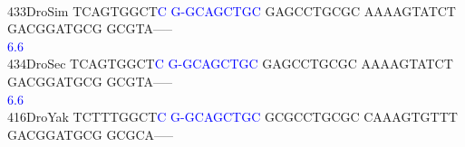 \documentclass[11pt,twoside,reqno,a4paper]{article}
\begin{document}
{\hspace*{4\charwidth}\hspace*{7\charwidth}\hspace*{1\charwidth}\hspace*{1\charwidth}\hspace*{1\charwidth}\hspace*{1\charwidth}\hspace*{1\charwidth}\hspace*{1\charwidth}\\
433\hspace*{1\charwidth}DroSim	TCAGTGGCT\textcolor{blue}{C}	\textcolor{blue}{G}\textcolor{blue}{-}\textcolor{blue}{G}\textcolor{blue}{C}\textcolor{blue}{A}\textcolor{blue}{G}\textcolor{blue}{C}\textcolor{blue}{T}\textcolor{blue}{G}\textcolor{blue}{C}	GAGCCTGCGC	AAAAGTATCT	GACGGATGCG	GCGTA-----	\\
\hspace*{4\charwidth}\hspace*{7\charwidth}\hspace*{9\charwidth}\textcolor{blue}{6.6}\hspace*{1\charwidth}\hspace*{1\charwidth}\hspace*{1\charwidth}\hspace*{1\charwidth}\hspace*{1\charwidth}\hspace*{1\charwidth}\\
434\hspace*{1\charwidth}DroSec	TCAGTGGCT\textcolor{blue}{C}	\textcolor{blue}{G}\textcolor{blue}{-}\textcolor{blue}{G}\textcolor{blue}{C}\textcolor{blue}{A}\textcolor{blue}{G}\textcolor{blue}{C}\textcolor{blue}{T}\textcolor{blue}{G}\textcolor{blue}{C}	GAGCCTGCGC	AAAAGTATCT	GACGGATGCG	GCGTA-----	\\
\hspace*{4\charwidth}\hspace*{7\charwidth}\hspace*{9\charwidth}\textcolor{blue}{6.6}\hspace*{1\charwidth}\hspace*{1\charwidth}\hspace*{1\charwidth}\hspace*{1\charwidth}\hspace*{1\charwidth}\hspace*{1\charwidth}\\
416\hspace*{1\charwidth}DroYak	TCTTTGGCT\textcolor{blue}{C}	\textcolor{blue}{G}\textcolor{blue}{-}\textcolor{blue}{G}\textcolor{blue}{C}\textcolor{blue}{A}\textcolor{blue}{G}\textcolor{blue}{C}\textcolor{blue}{T}\textcolor{blue}{G}\textcolor{blue}{C}	GCGCCTGCGC	CAAAGTGTTT	GACGGATGCG	GCGCA-----	\\
}
\end{document}
